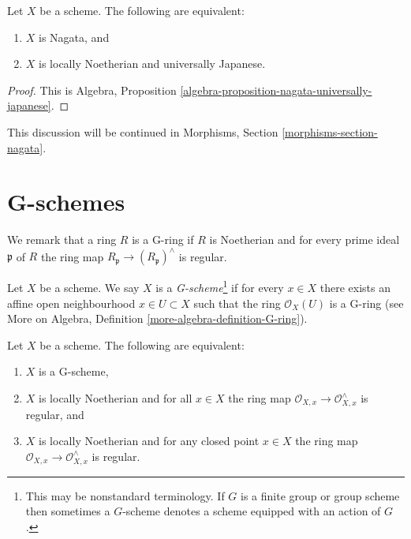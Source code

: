 \begin{lemma}
\label{lemma-nagata-universally-Japanese}
Let $X$ be a scheme.
The following are equivalent:
\begin{enumerate}
\item $X$ is Nagata, and
\item $X$ is locally Noetherian and universally Japanese.
\end{enumerate}
\end{lemma}

\begin{proof}
This is
Algebra, Proposition \ref{algebra-proposition-nagata-universally-japanese}.
\end{proof}

\noindent
This discussion will be continued in
Morphisms, Section \ref{morphisms-section-nagata}.



\section{G-schemes}
\label{section-G-scheme}

\noindent
We remark that a ring $R$ is a G-ring if $R$ is Noetherian and
for every prime ideal $\mathfrak p$ of $R$ the ring map
$R_\mathfrak p \to (R_\mathfrak p)^\wedge$ is regular.

\begin{definition}
\label{definition-G-scheme}
Let $X$ be a scheme. We say $X$ is a {\it G-scheme}\footnote{This may be
nonstandard terminology. If $G$ is a finite group or group scheme
then sometimes a $G$-scheme denotes a scheme equipped with an
action of $G$.} if for every $x \in X$ there exists an affine
open neighbourhood $x \in U \subset X$ such that the ring
$\mathcal{O}_X(U)$ is a G-ring (see
More on Algebra, Definition \ref{more-algebra-definition-G-ring}).
\end{definition}

\begin{lemma}
\label{lemma-characterize-G-scheme}
Let $X$ be a scheme. The following are equivalent:
\begin{enumerate}
\item $X$ is a G-scheme,
\item $X$ is locally Noetherian and for all $x \in X$ the ring
map $\mathcal{O}_{X, x} \to \mathcal{O}_{X, x}^\wedge$ is regular, and
\item $X$ is locally Noetherian and for any closed point $x \in X$
the ring map $\mathcal{O}_{X, x} \to \mathcal{O}_{X, x}^\wedge$ is regular.
\end{enumerate}
\end{lemma}


